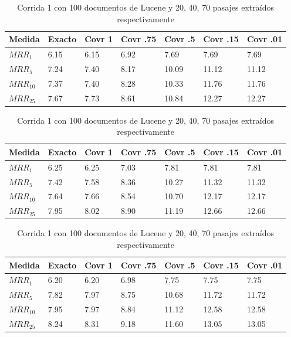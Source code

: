 \begin{table}
\centering
\begin{center}
\begin{tabular}{|l | l | l | l | l | l | l |}
\hline
Medida & Exacto & Covr 1 & Covr .75 & Covr .5 & Covr .15 & Covr .01 \\ \hline
$MRR_{1}$ & 6.15 & 6.15 & 6.92 & 7.69 & 7.69 & 7.69  \\ \hline
$MRR_{5}$ & 7.24 & 7.40 & 8.17 & 10.09 & 11.12 & 11.12  \\ \hline
$MRR_{10}$ & 7.37 & 7.40 & 8.28 & 10.33 & 11.76 & 11.76  \\ \hline
$MRR_{25}$ & 7.67 & 7.73 & 8.61 & 10.84 & 12.27 & 12.27  \\ \hline
\end{tabular}

\medskip

\begin{tabular}{|l | l | l | l | l | l | l |}
\hline
Medida & Exacto & Covr 1 & Covr .75 & Covr .5 & Covr .15 & Covr .01 \\ \hline
$MRR_{1}$ & 6.25 & 6.25 & 7.03 & 7.81 & 7.81 & 7.81  \\ \hline
$MRR_{5}$ & 7.42 & 7.58 & 8.36 & 10.27 & 11.32 & 11.32  \\ \hline
$MRR_{10}$ & 7.64 & 7.66 & 8.54 & 10.70 & 12.17 & 12.17  \\ \hline
$MRR_{25}$ & 7.95 & 8.02 & 8.90 & 11.19 & 12.66 & 12.66  \\ \hline
\end{tabular}

\medskip

\begin{tabular}{|l | l | l | l | l | l | l |}
\hline
Medida & Exacto & Covr 1 & Covr .75 & Covr .5 & Covr .15 & Covr .01 \\ \hline
$MRR_{1}$ & 6.20 & 6.20 & 6.98 & 7.75 & 7.75 & 7.75  \\ \hline
$MRR_{5}$ & 7.82 & 7.97 & 8.75 & 10.68 & 11.72 & 11.72  \\ \hline
$MRR_{10}$ & 7.95 & 7.97 & 8.84 & 11.12 & 12.58 & 12.58  \\ \hline
$MRR_{25}$ & 8.24 & 8.31 & 9.18 & 11.60 & 13.05 & 13.05  \\ \hline
\end{tabular}

\caption{Corrida 1 con 100 documentos de Lucene y 20, 40, 70 pasajes extraídos respectivamente}
\label{table:1_100_getExactMRRWikiFactoid_getCovrMRRWikiFactoid}
\end{center}
\end{table}


